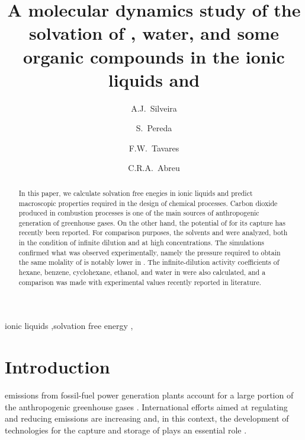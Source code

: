 \documentclass[3p,twocolumn]{elsarticle}
\begin{document}
\begin{frontmatter}

\title{A molecular dynamics study of the solvation of , water, and some organic compounds in the ionic liquids \ce{[emim][B(CN)_4]} and \ce{[emim][NTf_2]}}

\author[rvt]{A.J.~Silveira}
\author[rvt]{S.~Pereda}
\author[focal,els]{F.W.~Tavares}
\author[focal]{C.R.A.~Abreu}

\address[rvt]{Planta Piloto de Ingenier\'ia Qu\'imica, PLAPIQUI, Universidad Nacional del Sur,Camino La Carrindanga Km 7-CC: 717, Bah\'ia Blanca, Argentina}
\address[focal]{Chemical Engineering Department, Escola de Qu\'imica, Universidade Federal do Rio de Janeiro,Rio de Janeiro, RJ 21941-909, Brazil}
\address[els]{COPPE, Universidade Federal do Rio de Janeiro, Rio de Janeiro, RJ 21941-909, Brazil}


\begin{abstract}
In this paper, we calculate solvation free enegies in ionic liquids and predict macroscopic properties required in the design of chemical processes. Carbon dioxide produced in combustion processes is one of the main sources of anthropogenic generation of greenhouse gases. On the other hand, the potential of \ce{[emim][B(CN)_4]} for its capture has recently been reported. For comparison purposes, the solvents \ce{[emim][B(CN)_4]} and \ce{[emim][NTf_2]} were analyzed, both in the condition of infinite dilution and at high concentrations. The simulations confirmed what was observed experimentally, namely the pressure required to obtain the same molality of  is notably lower in \ce{[emim][B(CN)_4]}. The infinite-dilution activity coefficients of hexane, benzene, cyclohexane, ethanol, and water in \ce{[emim][B(CN)_4]} were also calculated, and a comparison was made with experimental values recently reported in literature.
\end{abstract}

\begin{keyword}
ionic liquids \sep solvation free energy \sep  {} 
\end{keyword}

\end{frontmatter}

\linenumbers

\section{Introduction}
 emissions from fossil-fuel power generation plants account for a large portion of the anthropogenic greenhouse gases \cite{totalenergy}. International efforts aimed at regulating and reducing  emissions are increasing \cite{Tong_2018} and, in this context, the development of technologies for the capture and storage of  plays an essential role \cite{Markewitz_2014}. 
\end{document}
